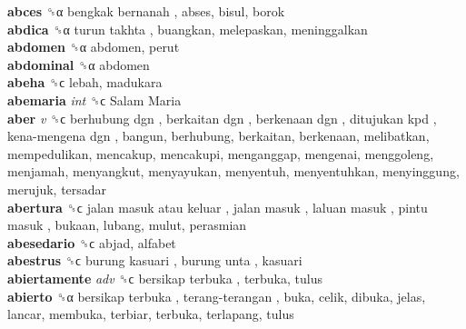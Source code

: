 \textbf{abces} ␝α   bengkak bernanah , abses, bisul, borok  \\
\textbf{abdica} ␝α   turun takhta , buangkan, melepaskan, meninggalkan  \\
\textbf{abdomen} ␝α  abdomen, perut  \\
\textbf{abdominal} ␝α  abdomen  \\
\textbf{abeha} ␝ϲ  lebah, madukara  \\
\textbf{abemaria} \emph{int}  ␝ϲ   Salam Maria   \\
\textbf{aber} \emph{v}  ␝ϲ   berhubung dgn ,  berkaitan dgn ,  berkenaan dgn ,  ditujukan kpd ,  kena-mengena dgn , bangun, berhubung, berkaitan, berkenaan, melibatkan, mempedulikan, mencakup, mencakupi, menganggap, mengenai, menggoleng, menjamah, menyangkut, menyayukan, menyentuh, menyentuhkan, menyinggung, merujuk, tersadar  \\
\textbf{abertura} ␝ϲ   jalan masuk atau keluar ,  jalan masuk ,  laluan masuk ,  pintu masuk , bukaan, lubang, mulut, perasmian  \\
\textbf{abesedario} ␝ϲ  abjad, alfabet  \\
\textbf{abestrus} ␝ϲ   burung kasuari ,  burung unta , kasuari  \\
\textbf{abiertamente} \emph{adv}  ␝ϲ   bersikap terbuka , terbuka, tulus  \\
\textbf{abierto} ␝α   bersikap terbuka ,  terang-terangan , buka, celik, dibuka, jelas, lancar, membuka, terbiar, terbuka, terlapang, tulus  \\
